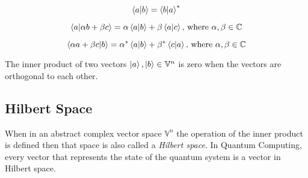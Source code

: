 \begin{equation}
    \braket{a|b}=\braket{b|a}^*
\end{equation}

\begin{equation}
    \braket{a|\alpha b+\beta c}=\alpha\braket{a|b}+\beta\braket{a|c}\text{, where }\alpha,\beta\in\mathbb{C}
\end{equation}

\begin{equation}
    \braket{\alpha a+\beta c|b}=\alpha^*\braket{a|b}+\beta^*\braket{c|a}\text{, where }\alpha,\beta\in\mathbb{C}
\end{equation}

The inner product of two vectors $\ket{a},\ket{b}\in\mathbb{V}^n$ is zero when the vectors are orthogonal to each other.

\subsection{Hilbert Space}

When in an abstract complex vector space $\mathbb{V}^n$ the operation of the inner product is defined then
that space is also called a \textit{Hilbert space}. In Quantum Computing, every vector that represents the
state of the quantum system is a vector in Hilbert space.